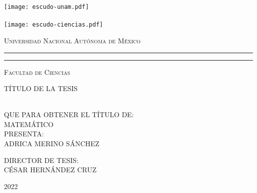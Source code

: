 



\newcommand{\titulo}[1]{\def\eltitulo{#1}}
\newcommand{\carrera}[1]{\def\lacarrera{#1}}
\newcommand{\nombre}[1]{\def\elnombre{#1}}      %
\newcommand{\director}[1]{\def\eldirector{#1}}  %
\newcommand{\fecha}[1]{\def\lafecha{#1}}

\titulo{T\'ITULO DE LA TESIS}
\nombre{\uppercase{ADRICA MERINO S\'ANCHEZ}}
\carrera{MATEM\'ATICO}
\director{\uppercase{C\'ESAR HERN\'ANDEZ CRUZ}}
\fecha{2022}


\thispagestyle{empty}

\hskip-1.5cm
\begin{minipage}[c][10cm][s]{3cm}
  \begin{center}
    \texttt{[image: escudo-unam.pdf]}\\[10pt]
    \hskip2pt\vrule width2pt height13cm\hskip1mm
    \vrule width1pt height13cm\\[10pt]
    \texttt{[image: escudo-ciencias.pdf]}
  \end{center}
\end{minipage}\quad
\begin{minipage}[c][9.5cm][s]{10cm}
  \begin{center}
    {\large \scshape Universidad Nacional Aut\'onoma de M\'exico}
    \vspace{.3cm}
    \hrule height2pt
    \vspace{.1cm}
    \hrule height1pt
    \vspace{.3cm}
    {\scshape Facultad de Ciencias}

    \vspace{3cm}

    {\Large \eltitulo}

    \vspace{3cm}

    \\[8pt]
    QUE PARA OBTENER EL T\'ITULO DE:\\[3pt]
    \mbox{}\lacarrera\\[13pt]
    PRESENTA:\\[3pt]
    \elnombre

    \vspace{2cm}

    {\small DIRECTOR DE TESIS:\\ \eldirector}

    \vspace{2cm}

    \lafecha

  \end{center}
\end{minipage}
